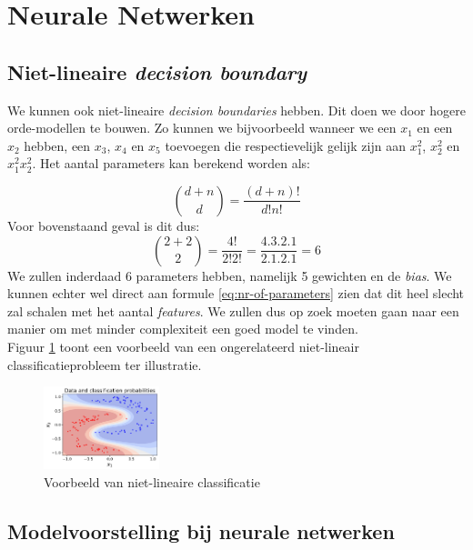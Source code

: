\section{Neurale Netwerken}

\subsection{Niet-lineaire \textit{decision boundary}}

We kunnen ook niet-lineaire \textit{decision boundaries} hebben. Dit doen we door hogere orde-modellen te bouwen. Zo kunnen we bijvoorbeeld wanneer we een $x_{1}$ en een $x_{2}$ hebben, een $x_{3}$, $x_{4}$ en $x_{5}$ toevoegen die respectievelijk gelijk zijn aan $x_{1}^{2}$, $x_{2}^{2}$ en $x_{1}^{2} x_{2}^{2}$. Het aantal parameters kan berekend worden als:

\begin{equation}
	{d + n \choose d} = \frac{(d+n)!}{d! n!}
	\label{eq:nr-of-parameters}
\end{equation}
\noindent
Voor bovenstaand geval is dit dus: 
\begin{equation*}
	{2 + 2 \choose 2} = \frac{4!}{2! 2!} = \frac{4.3.2.1}{2.1.2.1} = 6
\end{equation*}
\newpage
\noindent
We zullen inderdaad 6 parameters hebben, namelijk 5 gewichten en de \textit{bias}. We kunnen echter wel direct aan formule \ref{eq:nr-of-parameters} zien dat dit heel slecht zal schalen met het aantal \textit{features}. We zullen dus op zoek moeten gaan naar een manier om met minder complexiteit een goed model te vinden. \\
\newline
Figuur \ref{fig:non-linear-classification} toont een voorbeeld van een ongerelateerd niet-lineair classificatieprobleem ter illustratie.
\begin{figure}[h]
	\centering
	\includegraphics[width=0.3\textwidth]{images/12-non-linear-classification.png}
	\caption{Voorbeeld van niet-lineaire classificatie}
	\label{fig:non-linear-classification}
\end{figure}

\subsection{Modelvoorstelling bij neurale netwerken}

